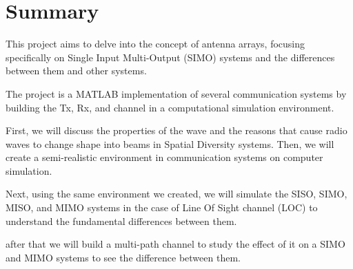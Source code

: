 \chapter*{Summary}

This project aims to delve into the concept of antenna arrays, focusing specifically on Single Input Multi-Output (SIMO) systems and the differences between them and other systems.

The project is a MATLAB implementation of several communication systems by building the Tx, Rx, and channel in a computational simulation environment.

First, we will discuss the properties of the wave and the reasons that cause radio waves to change shape into beams in Spatial Diversity systems. Then, we will create a semi-realistic environment in communication systems on computer simulation.

Next, using the same environment we created, we will simulate the SISO, SIMO, MISO, and MIMO systems in the case of Line Of Sight channel (LOC) to understand the fundamental differences between them.

after that we will build a multi-path channel to study the effect of it on a SIMO and MIMO systems to see the difference between them.